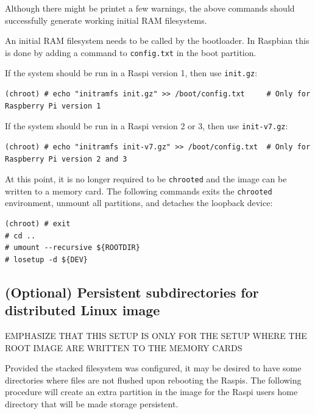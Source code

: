 
Although there might be printet a few warnings, the above commands should successfully
generate working initial \ac{RAM} filesystems. 

An initial \ac{RAM} filesystem needs to be called by the bootloader. In Raspbian
this is done by adding a command to \texttt{config.txt} in the boot partition.

If the system should be run in a \ac{Raspi} version 1, then use \texttt{init.gz}:
\begin{lstlisting}[]
(chroot) # echo "initramfs init.gz" >> /boot/config.txt     # Only for Raspberry Pi version 1
\end{lstlisting}
\FloatBarrier
\vspace{-5mm}

If the system should be run in a \ac{Raspi} version 2 or 3, then use \texttt{init-v7.gz}:
\begin{lstlisting}[]
(chroot) # echo "initramfs init-v7.gz" >> /boot/config.txt  # Only for Raspberry Pi version 2 and 3
\end{lstlisting}
\FloatBarrier
\vspace{-5mm}

At this point, it is no longer required to be \texttt{chrooted} and the image
can be written to a memory card. The following commands exits the \texttt{chrooted}
environment, unmount all partitions, and detaches the loopback device:

\begin{lstlisting}[]
(chroot) # exit
# cd ..
# umount --recursive ${ROOTDIR}
# losetup -d ${DEV}
\end{lstlisting}
\FloatBarrier
\vspace{-5mm}

\subsection{(Optional) Persistent subdirectories for distributed Linux image}

EMPHASIZE THAT THIS SETUP IS ONLY FOR THE SETUP WHERE THE ROOT IMAGE ARE
WRITTEN TO THE MEMORY CARDS

Provided the stacked filesystem was configured, it may be desired to have
some directories where files are not flushed upon rebooting the \ac{Raspi}s.
The following procedure will create an extra partition in the image for
the \ac{Raspi} users home directory that will be made storage persistent.


